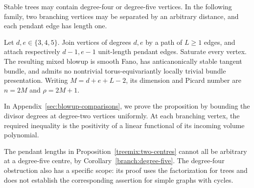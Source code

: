 Stable trees may contain degree-four or degree-five vertices. In the
following family, two branching vertices may be separated by an
arbitrary distance, and each pendant edge has length one.

\begin{proposition}\label{treemix:two-centres}
Let $d,e\in\{3,4,5\}$. Join vertices of degrees $d,e$ by a path of
$L\ge1$ edges, and attach respectively $d-1,e-1$ unit-length pendant
edges. Saturate every vertex. The resulting mixed blowup is smooth Fano,
has anticanonically stable tangent bundle, and admits no nontrivial
torus-equivariantly locally trivial bundle presentation. Writing
$M=d+e+L-2$, its dimension and Picard number are $n=2M$ and $\rho=2M+1$.
\end{proposition}

In Appendix~\ref{sec:blowup-comparisons}, we prove the proposition by
bounding the divisor degrees at degree-two vertices uniformly. At each
branching vertex, the required inequality is the positivity of a
linear functional of its incoming volume polynomial.


The pendant lengths in Proposition~\ref{treemix:two-centres} cannot all
be arbitrary at a degree-five centre, by
Corollary~\ref{branch:degree-five}. The degree-four obstruction also
has a specific scope: its proof uses the factorization for trees and
does not establish the corresponding assertion for simple graphs
with cycles.
